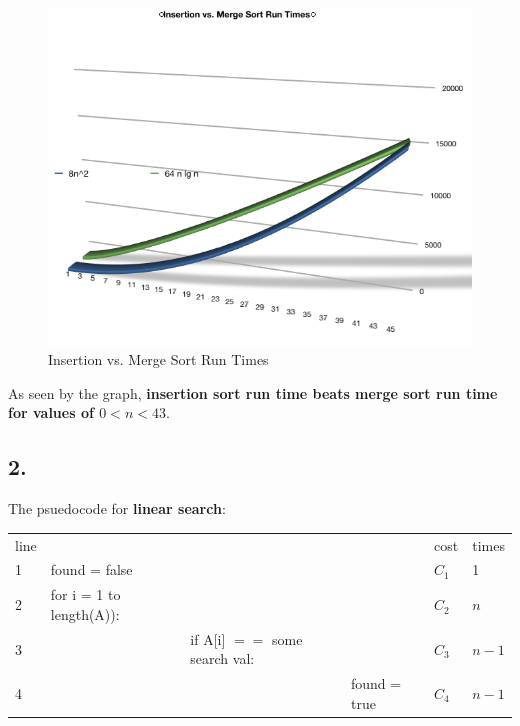\documentclass[11pt,letterpaper]{article}
\begin{document}
\begin{figure}[!h]
	\begin{center}
		\includegraphics[width=120mm]{images/insertion_vs_merge_sort}
               	\caption{Insertion vs. Merge Sort Run Times}
                \label{insertion_vs_merge_sort}
        \end{center}
\end{figure}

As seen by the graph, \textbf{insertion sort run time beats merge sort run time for values of $ 0 < n < 43 $}.


\subsection*{2.}
The psuedocode for \textbf{linear search}:

\scriptsize
\begin{tabular}{ l l l l l l }
line&				& &			&	cost 		&	times \\
1 &	found = false		& &			&	$C_1$	&	1 \\
2 &	for i = 1 to length(A)):& & 		&	$C_2$	&	$n$ \\	
3 &	&	if A[i] $==$ some search val: 	& 	&	$C_3$	&	$ n - 1 $ \\
4 &	& &		found = true			&	$C_4$	&	$ n - 1 $ \\
\end{tabular} \\
\normalsize
\end{document}

